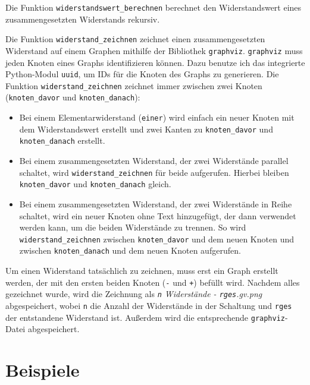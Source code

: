 \documentclass[a4paper,10pt,ngerman]{scrartcl}
\begin{document}
Die Funktion \texttt{widerstandswert\_berechnen} berechnet den Widerstandswert eines zusammengesetzten Widerstands rekursiv.

Die Funktion \texttt{widerstand\_zeichnen} zeichnet einen zusammengesetzten Widerstand auf einem Graphen mithilfe der Bibliothek \texttt{graphviz}. \texttt{graphviz} muss jeden Knoten eines Graphs identifizieren können. Dazu benutze ich das integrierte Python-Modul \texttt{uuid}, um IDs für die Knoten des Graphs zu generieren. Die Funktion \texttt{widerstand\_zeichnen} zeichnet immer zwischen zwei Knoten (\texttt{knoten\_davor} und \texttt{knoten\_danach}):
\begin{itemize}
  \item Bei einem Elementarwiderstand (\texttt{einer}) wird einfach ein neuer Knoten mit dem Widerstandswert erstellt und zwei Kanten zu \texttt{knoten\_davor} und \texttt{knoten\_danach} erstellt.
  \item Bei einem zusammengesetzten Widerstand, der zwei Widerstände parallel schaltet, wird \texttt{widerstand\_zeichnen} für beide aufgerufen. Hierbei bleiben \texttt{knoten\_davor} und \texttt{knoten\_danach} gleich.
  \item Bei einem zusammengesetzten Widerstand, der zwei Widerstände in Reihe schaltet, wird ein neuer Knoten ohne Text hinzugefügt, der dann verwendet werden kann, um die beiden Widerstände zu trennen. So wird \texttt{widerstand\_zeichnen} zwischen \texttt{knoten\_davor} und dem neuen Knoten und zwischen \texttt{knoten\_danach} und dem neuen Knoten aufgerufen.
\end{itemize}
Um einen Widerstand tatsächlich zu zeichnen, muss erst ein Graph erstellt werden, der mit den ersten beiden Knoten (\texttt{-} und \texttt{+}) befüllt wird. Nachdem alles gezeichnet wurde, wird die Zeichnung als \textit{\texttt{n} Widerstände - \texttt{rges}.gv.png} abgespeichert, wobei \texttt{n} die Anzahl der Widerstände in der Schaltung und \texttt{rges} der entstandene Widerstand ist. Außerdem wird die entsprechende \texttt{graphviz}-Datei abgespeichert.

\section{Beispiele}

\newcommand{\widerstand}[4]{
  \begin{figure}[H]
    \centering
    \texttt{[image: beispiele/beispiel\#1-\#3]}
    \caption{#2$\Omega$ - #3 \ifnum#3<2 Widerstand \else Widerstände \fi (#4$\Omega$)} 
  \end{figure}
}
\end{document}
